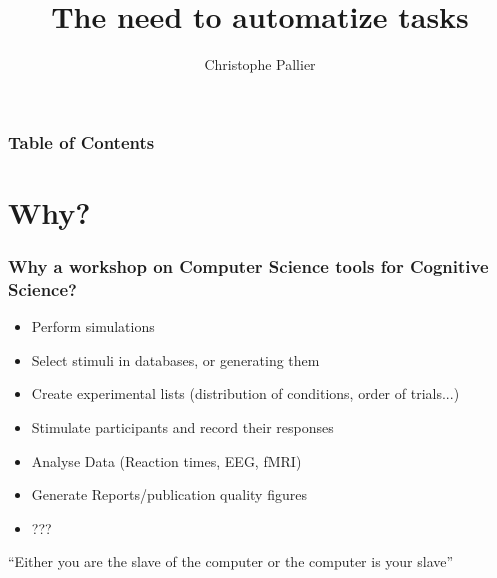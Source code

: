 \documentclass{beamer}
\title[Tips and Tricks]
{The need to automatize tasks}
\subtitle{}
\author[Christophe Pallier] %
{Christophe Pallier}
\institute
{
  CNRS\\
  Unit\'e INSERM-CEA de Neuroimagerie Cognitive\\
  Gif-sur-Yvette
}
\date[17 Juin 2013] %
\newcounter{saveenumi}
\newcommand{\seti}{\setcounter{saveenumi}{\value{enumi}}}
\newcommand{\conti}{\setcounter{enumi}{\value{saveenumi}}}
\begin{document}
\frame{\titlepage}

\begin{frame}
\frametitle{Table of Contents}
\tableofcontents[currentsection]


\end{frame}




\section{Why?}

\begin{frame}
\frametitle{Why a workshop on Computer Science tools for Cognitive Science?}

\begin{itemize}
\item Perform simulations
\pause

\item Select stimuli in databases, or generating them
\pause

\item Create experimental lists (distribution of conditions, order of trials...)
\pause

\item Stimulate participants and record their responses
\pause

\item Analyse Data (Reaction times, EEG, fMRI)
\pause

\item Generate Reports/publication quality figures
\pause

\item ??? 
\end{itemize}

\pause

\begin{centering}
``Either you are the slave of the computer or the computer is your slave''
\end{centering}
\end{frame}
\end{document}
